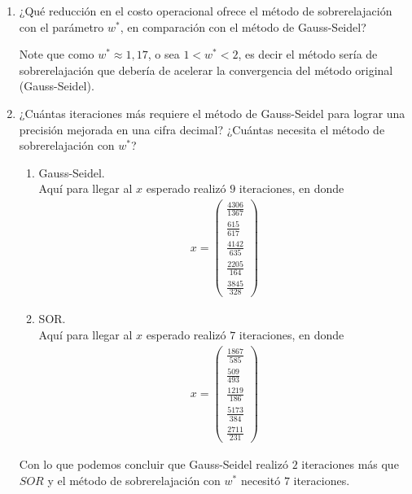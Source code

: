 \begin{homeworkProblem}
\begin{enumerate}
\begin{solucion}
      \end{solucion}
    \item ¿Qué reducción en el costo operacional ofrece el método de sobrerelajación con el parámetro $w^*$, en comparación con el método de Gauss-Seidel?
      \begin{solucion}
        Note que como $w^*\approx 1,17$, o sea $1<w^*<2$, es decir el método sería de sobrerelajación que debería de acelerar la convergencia del método original (Gauss-Seidel).  
      \end{solucion}
    \item ¿Cuántas iteraciones más requiere el método de Gauss-Seidel para lograr una precisión mejorada en una cifra decimal? ¿Cuántas necesita el método de sobrerelajación con $w^*$?
      \begin{solucion}
        \begin{enumerate}
          \item Gauss-Seidel.\\
            Aquí para llegar al $x$ esperado realizó $9$ iteraciones, en donde
            \begin{align*}
              x=\begin{pmatrix}
                \frac{4306}{1367}\\  
                \frac{615}{617}\\
                \frac{4142}{635}\\
                \frac{2205}{164}\\
                \frac{3845}{328}     
              \end{pmatrix}
            \end{align*}
          \item SOR.\\
            Aquí para llegar al $x$ esperado realizó $7$ iteraciones, en donde
            \begin{align*}
              x=\begin{pmatrix}
                \frac{1867}{585}\\
                \frac{509}{493}\\
                \frac{1219}{186}\\
                \frac{5173}{384}\\
                \frac{2711}{231}     
              \end{pmatrix}
            \end{align*}
        \end{enumerate}
        Con lo que podemos concluir que Gauss-Seidel realizó $2$ iteraciones más que $SOR$ y el método de sobrerelajación con $w^*$ necesitó $7$ iteraciones. 

\end{solucion}
\end{enumerate}
\end{homeworkProblem}
